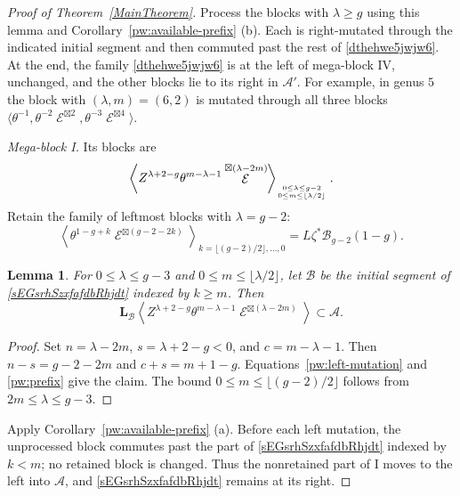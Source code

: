 \documentclass[11pt,letterpaper]{amsart}
\theoremstyle{plain}
\newtheorem{lemma}[theorem]{Lemma}
\theoremstyle{definition}
\theoremstyle{remark}
\numberwithin{equation}{section}
\DeclareMathOperator{\cE}{\mathcal{E}}
\begin{document}
\begin{proof}[Proof of Theorem~\ref{MainTheorem}]
Process the blocks with $\lambda\geq g$ using this lemma and
Corollary~\ref{pw:available-prefix}
(b).  Each is right-mutated through
the indicated initial segment and then commuted past the rest of
\eqref{dthehwe5jwjw6}.  At the end, the family
\eqref{dthehwe5jwjw6} is at the left of mega-block IV, unchanged,
and the other blocks lie to its right in $\mathcal A'$.
For example, in genus $5$ the block with $(\lambda,m)=(6,2)$ is
mutated through all three blocks
$
 \langle\theta^{-1},\theta^{-2}\cE^{\boxtimes2},
                \theta^{-3}\cE^{\boxtimes4}\rangle$.

\smallskip
\noindent\textit{Mega-block I.}
Its blocks are
\begin{equation}\label{sEGsrhSRhjdt}
 \left\langle Z^{\lambda+2-g}\theta^{m-\lambda-1}
           \cE^{\boxtimes(\lambda-2m)}\right\rangle_{{0\leq\lambda\leq g-2}\atop
           {0\leq m\leq\lfloor\lambda/2\rfloor}}.
\end{equation}
Retain the family of leftmost blocks with $\lambda=g-2$:
\begin{equation}\label{sEGsrhSzxfafdbRhjdt}
 \left\langle\theta^{1-g+k}\cE^{\boxtimes(g-2-2k)}
 \right\rangle_{k=\lfloor(g-2)/2\rfloor,\ldots,0}
       =L\zeta^*\mathcal B_{g-2}(1-g).
\end{equation}

\begin{lemma}\label{megablocki}
For $0\leq\lambda\leq g-3$ and
$0\leq m\leq\lfloor\lambda/2\rfloor$, let $\mathcal B$ be the
initial segment of \eqref{sEGsrhSzxfafdbRhjdt} indexed by $k\geq m$.
Then
\[
 \mathbf L_{\mathcal B}
 \left\langle Z^{\lambda+2-g}\theta^{m-\lambda-1}
              \cE^{\boxtimes(\lambda-2m)}\right\rangle
       \subset\mathcal A.
\]
\end{lemma}

\begin{proof}
Set $n=\lambda-2m$, $s=\lambda+2-g<0$, and $c=m-\lambda-1$.
Then $n-s=g-2-2m$ and $c+s=m+1-g$.
Equations~\eqref{pw:left-mutation} and \eqref{pw:prefix} give the
claim.  The bound $0\leq m\leq\lfloor(g-2)/2\rfloor$ follows
from $2m\leq\lambda\leq g-3$.
\end{proof}

Apply 
Corollary~\ref{pw:available-prefix}
(a).  Before each left mutation,
the unprocessed block commutes past the part of
\eqref{sEGsrhSzxfafdbRhjdt} indexed by $k<m$; no retained block
is changed.  Thus the nonretained part of I moves to the left into
$\mathcal A$, and \eqref{sEGsrhSzxfafdbRhjdt} remains at its right.


\end{proof}
\end{document}
